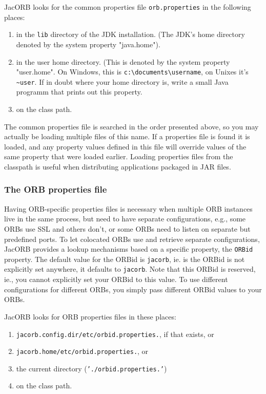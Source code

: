 JacORB looks for the common properties file {\tt orb.properties} in
the following places:

\begin{enumerate}
\item in the {\tt lib} directory of the JDK installation. (The JDK's
  home directory denoted by the system property "java.home").
\item in the user home directory. (This is denoted by the system
    property "user.home". On Windows, this is
    {\verb+c:\documents\username+}, on Unixes it's {\verb+~user+}. If
    in doubt where your home directory is, write a small Java programm that
  prints out this property.
\item on the class path.
\end{enumerate}

The common properties file is searched in the order presented above,
so you may actually be loading multiple files of this name. If a
properties file is found it is loaded, and any property values defined
in this file will override values of the same property that were
loaded earlier. Loading properties files from the classpath is useful
when distributing applications packaged in JAR files.

\subsubsection{The ORB properties file}

Having ORB-specific properties files is necessary when multiple ORB
instances live in the same process, but need to have separate
configurations, e.g., some ORBs use SSL and others don't, or some ORBs
need to listen on separate but predefined ports. To let colocated ORBs
use and retrieve separate configurations, JacORB provides a lookup
mechanisms based on a specific property, the {\tt ORBid} property. The
default value for the ORBid is {\tt jacorb}, ie. is the ORBid is not
explicitly set anywhere, it defaults to {\tt jacorb}. Note that this
ORBid is reserved, ie., you cannot explicitly set your ORBid to this
value. To use different configurations for different ORBs, you simply
pass different ORBid values to your ORBs.

JacORB looks for ORB properties files in these places:

\begin{enumerate}
\item {\tt jacorb.config.dir/etc/orbid.properties.}, if that exists, or
\item {\tt jacorb.home/etc/orbid.properties.}, or
\item the current directory ({\tt './orbid.properties.'})
\item on the class path.
\end{enumerate}

